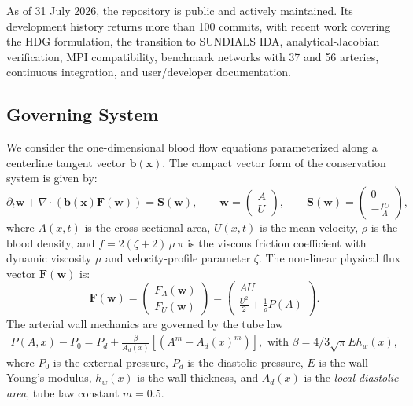 \documentclass[a4paper,12pt]{article}
\begin{document}
As of 31 July 2026, the repository is public and actively maintained. Its development history returns more than 100 commits, with recent work covering the HDG formulation, the transition to \textsc{SUNDIALS} IDA, analytical-Jacobian verification, MPI compatibility, benchmark networks with 37 and 56 arteries, continuous integration, and user/developer documentation.

\subsection{Governing System}
We consider the one-dimensional blood flow equations parameterized along a centerline tangent vector $\bm b(\bm x)$. The compact vector form of the conservation system is given by:
\begin{equation}
    \partial_t \mathbf{w} + \nabla \cdot \left(\bm b(\bm{x})  \mathbf{F}(\mathbf{w})\right) = \mathbf{S}(\mathbf{w}), \qquad
    \mathbf{w} = \begin{pmatrix} A \\ U \end{pmatrix}, \qquad
    \mathbf{S}(\mathbf{w}) = \begin{pmatrix} 0 \\ - \frac{f U}{A} \end{pmatrix},
\end{equation}
where $A(x,t)$ is the cross-sectional area, $U(x,t)$ is the mean velocity, $\rho$ is the blood density, and
$f = 2(\zeta+2)\,\mu\,\pi$ is the viscous friction coefficient
with dynamic viscosity $\mu$ and velocity-profile parameter
$\zeta$.
The non-linear physical flux vector $\mathbf{F}(\mathbf{w})$ is:
\begin{equation}
    \mathbf{F}(\mathbf{w}) = \begin{pmatrix} F_A(\mathbf{w}) \\ F_U(\mathbf{w}) \end{pmatrix} = \begin{pmatrix} A U \\ \frac{U^2}{2} + \frac{1}{\rho} P(A) \end{pmatrix}.
\end{equation}
The arterial wall mechanics are governed by the tube law
\begin{align*}
    P(A,x) - P_0 = P_d + \frac{\beta}{A_d(x)}
    \left[ (A^m - A_d(x)^m) \right], \text{ with }  \beta = 4/3 \sqrt{\pi} E h_w(x),
\end{align*}
where $P_0 $ is the external pressure, $P_d$ is the diastolic pressure,
$E$ is the wall Young's modulus,
$h_w(x)$ is the wall thickness, and
$A_d(x)$ is the \emph{local diastolic area}, tube law constant $m =0.5$.
\end{document}
